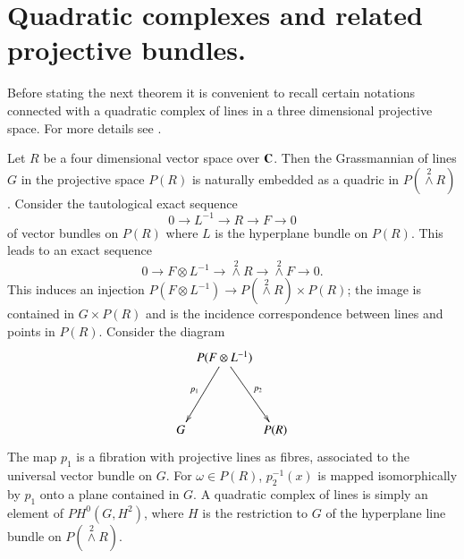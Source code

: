 \section{Quadratic complexes and related projective bundles.}\label{art17-sec5}

Before stating the next theorem it is convenient to recall certain notations connected with a quadratic complex of lines in a three dimensional projective space. For more details see \cite{art17-key3}.

Let $R$ be a four dimensional vector space over $\mathbf{C}$. Then the Grassmannian of lines $G$ in the projective space $P(R)$ is naturally embedded as a quadric in $P({\displaystyle{\mathop{\wedge}\limits^{2}}}R)$. Consider the tautological exact sequence
$$
0\to L^{-1}\to R\to F\to 0
$$
of vector bundles on $P(R)$ where $L$ is the hyperplane bundle on $P(R)$. This leads to an exact sequence
$$
0\to F\otimes L^{-1}\to {\displaystyle{\mathop{\wedge}\limits^{2}}} R\to {\displaystyle{\mathop{\wedge}\limits^{2}}} F\to 0. 
$$
This induces an injection $P(F\otimes L^{-1})\to P({\displaystyle{\mathop{\wedge}\limits^{2}}} R)\times P(R)$; the image is contained in $G\times P(R)$ and is the incidence correspondence between lines and points in $P(R)$. Consider the diagram
\[
\xymatrix@C=.1cm@R=1.5cm{
 & P(F\otimes L^{-1})\ar[dl]_-{p_{1}}\ar[dr]^-{p_{2}} &\\
G & & P(R)
}
\]
The map $p_{1}$ is a fibration with projective lines as fibres, associated to the universal vector bundle on $G$. For $\omega\in P(R)$, $p^{-1}_{2}(x)$ is mapped isomorphically by $p_{1}$ onto a plane contained in $G$. A quadratic complex of lines is simply an element of $PH^{0}(G,H^{2})$, where $H$ is the restriction to $G$ of the hyperplane line bundle on $P({\displaystyle{\mathop{\wedge}\limits^{2}}} R)$.


